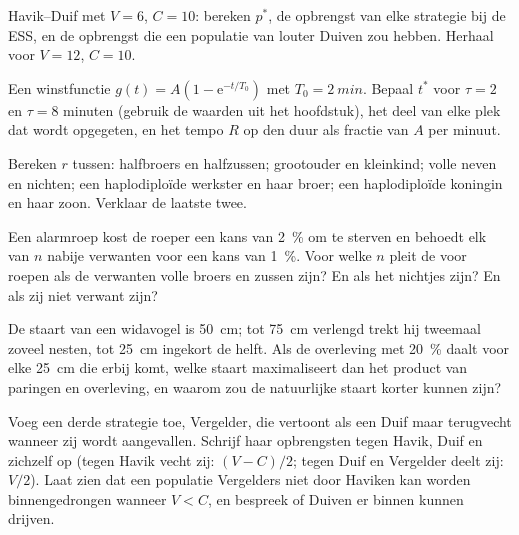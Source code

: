 \begin{exercise}[$\star\star$]\label{exo:b3:behavioural-ecology:5}
Havik--Duif met $V = 6$, $C = 10$: bereken $p^{*}$, de opbrengst van
elke strategie bij de ESS, en de opbrengst die een populatie van louter
Duiven zou hebben. Herhaal voor $V = 12$, $C = 10$.
\end{exercise}

\begin{exercise}[$\star\star$]\label{exo:b3:behavioural-ecology:6}
Een winstfunctie $g(t) = A(1 - \mathrm{e}^{-t/T_{0}})$ met $T_{0} =
\qty{2}{min}$. Bepaal $t^{*}$ voor $\tau = 2$ en $\tau = 8$ minuten
(gebruik de waarden uit het hoofdstuk), het deel van elke plek dat
wordt opgegeten, en het tempo $R$ op den duur als fractie van $A$ per
minuut.
\end{exercise}

\begin{exercise}[$\star\star$]\label{exo:b3:behavioural-ecology:7}
Bereken $r$ tussen: halfbroers en halfzussen; grootouder en kleinkind;
volle neven en nichten; een haplodiploïde werkster en haar broer; een
haplodiploïde koningin en haar zoon. Verklaar de laatste twee.
\end{exercise}

\begin{exercise}[$\star\star$]\label{exo:b3:behavioural-ecology:8}
Een alarmroep kost de roeper een kans van \qty{2}{\%} om te sterven en
behoedt elk van $n$ nabije verwanten voor een kans van \qty{1}{\%}.
Voor welke $n$ pleit de  voor roepen als de verwanten
volle broers en zussen zijn? En als het nichtjes zijn? En als zij niet
verwant zijn?
\end{exercise}

\begin{exercise}[$\star\star$]\label{exo:b3:behavioural-ecology:9}
De staart van een widavogel is \qty{50}{cm}; tot \qty{75}{cm} verlengd
trekt hij tweemaal zoveel nesten, tot \qty{25}{cm} ingekort de helft.
Als de overleving met \qty{20}{\%} daalt voor elke \qty{25}{cm} die
erbij komt, welke staart maximaliseert dan het product van paringen en
overleving, en waarom zou de natuurlijke staart korter kunnen zijn?
\end{exercise}

\begin{exercise}[$\star\star\star$]\label{exo:b3:behavioural-ecology:10}
Voeg een derde strategie toe, Vergelder, die vertoont als een Duif maar
terugvecht wanneer zij wordt aangevallen. Schrijf haar opbrengsten
tegen Havik, Duif en zichzelf op (tegen Havik vecht zij: $(V - C)/2$;
tegen Duif en Vergelder deelt zij: $V/2$). Laat zien dat een populatie
Vergelders niet door Haviken kan worden binnengedrongen wanneer $V < C$,
en bespreek of Duiven er binnen kunnen drijven.
\end{exercise}

